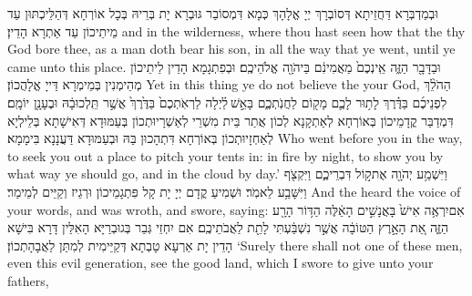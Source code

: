 {וּבְמַדְבְּרָא דַּחֲזֵיתָא דְּסוֹבְרָךְ יְיָ אֱלָהָךְ כְּמָא דִּמְסוֹבַר גּוּבְרָא יָת בְּרֵיהּ בְּכָל אוֹרְחָא דְּהַלֵּיכְתּוּן עַד מֵיתֵיכוֹן עַד אַתְרָא הָדֵין׃}
{and in the wilderness, where thou hast seen how that the \lord\space thy God bore thee, as a man doth bear his son, in all the way that ye went, until ye came unto this place.}{}
{וּבַדָּבָ֖ר הַזֶּ֑ה אֵֽינְכֶם֙ מַאֲמִינִ֔ם בַּיהֹוָ֖ה אֱלֹהֵיכֶֽם׃}
{וּבְפִתְגָמָא הָדֵין לֵיתֵיכוֹן מְהֵימְנִין בְּמֵימְרָא דַּייָ אֱלָהֲכוֹן׃}
{Yet in this thing ye do not believe the \lord\space your God,}{}
{הַהֹלֵ֨ךְ לִפְנֵיכֶ֜ם בַּדֶּ֗רֶךְ לָת֥וּר לָכֶ֛ם מָק֖וֹם לַחֲנֹֽתְכֶ֑ם בָּאֵ֣שׁ \legarmeh  לַ֗יְלָה לַרְאֹֽתְכֶם֙ בַּדֶּ֙רֶךְ֙ אֲשֶׁ֣ר תֵּֽלְכוּ\maqqaf בָ֔הּ וּבֶעָנָ֖ן יוֹמָֽם׃}
{דִּמְדַבַּר קֳדָמֵיכוֹן בְּאוֹרְחָא לְאַתְקָנָא לְכוֹן אֲתַר בֵּית מִשְׁרֵי לְאַשְׁרָיוּתְכוֹן בְּעַמּוּדָא דְּאִישָׁתָא בְּלֵילְיָא לְאַחְזָיוּתְכוֹן בְּאוֹרְחָא דִּתְהָכוּן בַּהּ וּבְעַמּוּדָא דַּעֲנָנָא בִּימָמָא׃}
{Who went before you in the way, to seek you out a place to pitch your tents in: in fire by night, to show you by what way ye should go, and in the cloud by day.’}{}
{וַיִּשְׁמַ֥ע יְהֹוָ֖ה אֶת\maqqaf ק֣וֹל דִּבְרֵיכֶ֑ם וַיִּקְצֹ֖ף וַיִּשָּׁבַ֥ע לֵאמֹֽר׃}
{וּשְׁמִיעַ קֳדָם יְיָ יָת קָל פִּתְגָמֵיכוֹן וּרְגֵיז וְקַיֵּים לְמֵימַר׃}
{And the \lord\space heard the voice of your words, and was wroth, and swore, saying:}{}
{אִם\maqqaf יִרְאֶ֥ה אִישׁ֙ בָּאֲנָשִׁ֣ים הָאֵ֔לֶּה הַדּ֥וֹר הָרָ֖ע הַזֶּ֑ה אֵ֚ת הָאָ֣רֶץ הַטּוֹבָ֔ה אֲשֶׁ֣ר נִשְׁבַּ֔עְתִּי לָתֵ֖ת לַאֲבֹתֵיכֶֽם׃}
{אִם יִחְזֵי גְּבַר בְּגוּבְרַיָּא הָאִלֵּין דָּרָא בִּישָׁא הָדֵין יָת אַרְעָא טָבְתָא דְּקַיֵּימִית לְמִתַּן לַאֲבָהָתְכוֹן׃}
{‘Surely there shall not one of these men, even this evil generation, see the good land, which I swore to give unto your fathers,}{}
